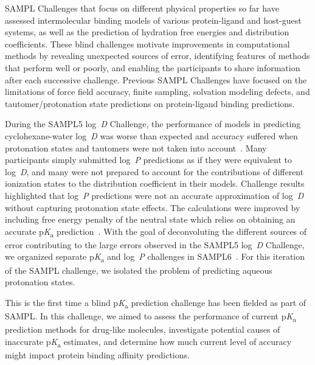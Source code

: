 \documentclass[9pt,lineno,final]{elife}
\newcommand{\pKa}{p\textit{K}\textsubscript{a}}
\newcommand{\logD}{log~\textit{D}}
\newcommand{\logP}{log~\textit{P}}
\begin{document}
SAMPL Challenges that focus on different physical properties so far have assessed intermolecular binding models of various protein-ligand and host-guest systems, as well as the prediction of hydration free energies and distribution coefficients. 
These blind challenges motivate improvements in computational methods by revealing unexpected sources of error, identifying features of methods that perform well or poorly, and enabling the participants to share information after each successive challenge.
Previous SAMPL Challenges have focused on the limitations of force field accuracy, finite sampling, solvation modeling defects, and tautomer/protonation state predictions on protein-ligand binding predictions.  

During the SAMPL5 \logD{} Challenge, the performance of models in predicting cyclohexane-water \logD{} was worse than expected and accuracy suffered when protonation states and tautomers were not taken into account~\citep{Pickard:2016:J.Comput.AidedMol.Des., Bannan:2018:J.Comput.AidedMol.Des.}. 
Many participants simply submitted \logP{} predictions as if they were equivalent to \logD{}, and many were not prepared to account for the contributions of different ionization states to the distribution coefficient in their models. 
Challenge results highlighted that \logP{} predictions were not an accurate approximation of \logD{} without capturing protonation state effects.
The calculations were improved by including free energy penalty of the neutral state which relies on obtaining an accurate \pKa{} prediction~\citep{Pickard:2016:J.Comput.AidedMol.Des.}.
With the goal of deconvoluting the different sources of error contributing to the large errors observed in the SAMPL5 \logD{} Challenge, we organized separate \pKa{} and \logP{} challenges in SAMPL6~\citep{Isik:2018:J.Comput.AidedMol.Des., Isik:2020:J.Comput.AidedMol.Des., Isik:2020:J.Comput.AidedMol.Des.a}. For this iteration of the SAMPL challenge, we isolated the problem of predicting aqueous protonation states. 

This is the first time a blind \pKa{} prediction challenge has been fielded as part of SAMPL. 
In this challenge, we aimed to assess the performance of current \pKa{} prediction methods for drug-like molecules, investigate potential causes of inaccurate \pKa{} estimates, and determine how much current level of accuracy might impact protein binding affinity predictions. 
\end{document}
